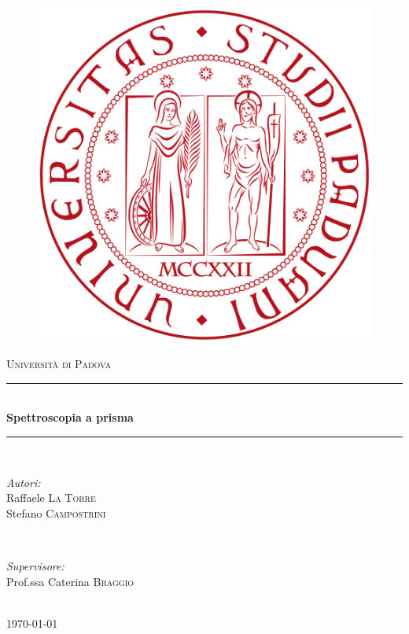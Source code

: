\documentclass{article}
\begin{document}
\begin{titlepage}
\newcommand{\HRule}{\rule{\linewidth}{0.5mm}}
\center


\begin{figure}
\center
\includegraphics[scale=0.1]{logo}
\end{figure}


\textsc{\LARGE Università di Padova}\\[1.5cm]
\HRule \\[0.4cm]
{ \huge \bfseries Spettroscopia a prisma}\\[0.4cm]
\HRule \\[1.5cm]

\begin{minipage}{0.4\textwidth}
\begin{flushleft} \large
\emph{Autori:}\\
Raffaele \textsc{La Torre} \\
Stefano \textsc{Campostrini}
\end{flushleft}
\end{minipage}
~
\begin{minipage}{0.4\textwidth}
\begin{flushright} \large
\emph{Supervisore:} \\
Prof.ssa Caterina \textsc{Braggio}
\end{flushright}
\end{minipage}\\[4cm]

{\large \today}\\[3cm]

\vfill
\end{titlepage}
\end{document}
